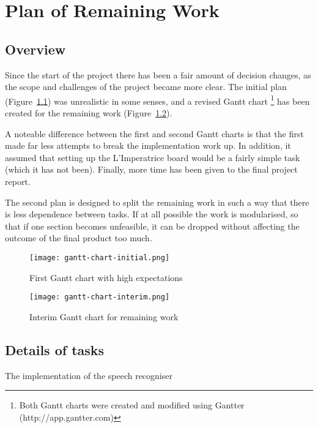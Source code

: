 \chapter{Plan of Remaining Work} %
\label{cha:plan_of_remaining_work}



\section{Overview} %
\label{sec:overview}
Since the start of the project there has been a fair amount of decision changes, as the scope and challenges of the project became more clear.  The initial plan (Figure~\ref{fig:gantt1}) was unrealistic in some senses, and a revised Gantt chart \footnote{Both Gantt charts were created and modified using Gantter (http://app.gantter.com)} has been created for the remaining work (Figure~\ref{fig:gantt2}). 

A noteable difference between the first and second Gantt charts is that the first made far less attempts to break the implementation work up.  In addition, it assumed that setting up the L'Imperatrice board would be a fairly simple task (which it has not been). Finally, more time has been given to the final project report.

The second plan is designed to split the remaining work in such a way that there is less dependence between tasks.  If at all possible the work is modularised, so that if one section becomes unfeasible, it can be dropped without affecting the outcome of the final product too much.


\begin{figure}[tb]
	\begin{center}
		\texttt{[image: gantt-chart-initial.png]}
	\end{center}
	\caption{First Gantt chart with high expectations}
	\label{fig:gantt1}
\end{figure}

\begin{figure}[tb]
	\begin{center}
		\texttt{[image: gantt-chart-interim.png]}
	\end{center}
	\caption{Interim Gantt chart for remaining work}
	\label{fig:gantt2}
\end{figure}


\section{Details of tasks} %
\label{sec:details_of_tasks}
The implementation of the speech recogniser


